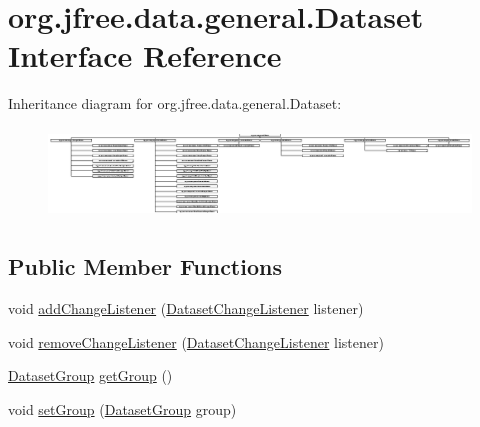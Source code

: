\hypertarget{interfaceorg_1_1jfree_1_1data_1_1general_1_1_dataset}{}\section{org.\+jfree.\+data.\+general.\+Dataset Interface Reference}
\label{interfaceorg_1_1jfree_1_1data_1_1general_1_1_dataset}
Inheritance diagram for org.\+jfree.\+data.\+general.\+Dataset\+:\begin{figure}[H]
\begin{center}
\leavevmode
\includegraphics[height=2.389333cm]{interfaceorg_1_1jfree_1_1data_1_1general_1_1_dataset}
\end{center}
\end{figure}
\subsection*{Public Member Functions}
\begin{DoxyCompactItemize}
\item 
void \mbox{\hyperlink{interfaceorg_1_1jfree_1_1data_1_1general_1_1_dataset_a34655e538642314586d5c92a4c055c4d}{add\+Change\+Listener}} (\mbox{\hyperlink{interfaceorg_1_1jfree_1_1data_1_1general_1_1_dataset_change_listener}{Dataset\+Change\+Listener}} listener)
\item 
void \mbox{\hyperlink{interfaceorg_1_1jfree_1_1data_1_1general_1_1_dataset_a47cc3418a0f49e520f72f8411601afc4}{remove\+Change\+Listener}} (\mbox{\hyperlink{interfaceorg_1_1jfree_1_1data_1_1general_1_1_dataset_change_listener}{Dataset\+Change\+Listener}} listener)
\item 
\mbox{\hyperlink{classorg_1_1jfree_1_1data_1_1general_1_1_dataset_group}{Dataset\+Group}} \mbox{\hyperlink{interfaceorg_1_1jfree_1_1data_1_1general_1_1_dataset_a48357df0f5aacd555b094627eb02d473}{get\+Group}} ()
\item 
void \mbox{\hyperlink{interfaceorg_1_1jfree_1_1data_1_1general_1_1_dataset_a48843f06c21e29847a62db0107b40138}{set\+Group}} (\mbox{\hyperlink{classorg_1_1jfree_1_1data_1_1general_1_1_dataset_group}{Dataset\+Group}} group)
\end{DoxyCompactItemize}


